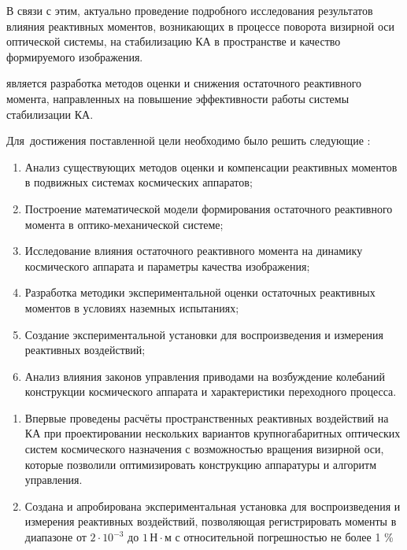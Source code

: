 В связи с этим, актуально проведение подробного исследования результатов влияния реактивных моментов, возникающих в процессе поворота визирной оси оптической системы, на стабилизацию КА в пространстве и качество формируемого изображения.



{\aim}  является разработка методов оценки и снижения остаточного реактивного момента, направленных на повышение эффективности работы системы стабилизации КА.

Для~достижения поставленной цели необходимо было решить следующие {\tasks}:
\begin{enumerate}[beginpenalty=10000] %
  \item Анализ существующих методов оценки и компенсации реактивных моментов в подвижных системах космических аппаратов;
  \item Построение математической модели формирования остаточного реактивного момента в оптико-механической системе;
  \item Исследование влияния остаточного реактивного момента на динамику космического аппарата и параметры качества изображения;
  \item Разработка методики экспериментальной оценки остаточных реактивных моментов в условиях наземных испытаниях;
  \item Создание экспериментальной установки для воспроизведения и измерения реактивных воздействий;
  \item Анализ влияния законов управления приводами на возбуждение колебаний конструкции космического аппарата и характеристики переходного процесса.
\end{enumerate}


{\novelty}
\begin{enumerate}[beginpenalty=10000] %
  \item Впервые проведены расчёты пространственных реактивных воздействий на КА при проектировании нескольких вариантов крупногабаритных оптических систем космического назначения с возможностью вращения визирной оси, которые позволили оптимизировать конструкцию аппаратуры и алгоритм управления.
  \item Создана и апробирована экспериментальная установка для воспроизведения и измерения реактивных воздействий, позволяющая регистрировать моменты в диапазоне от $2 \cdot 10^{-3}$ до $1\,\text{Н}\cdot\text{м}$ с относительной погрешностью не более 1 \%
\end{enumerate}

